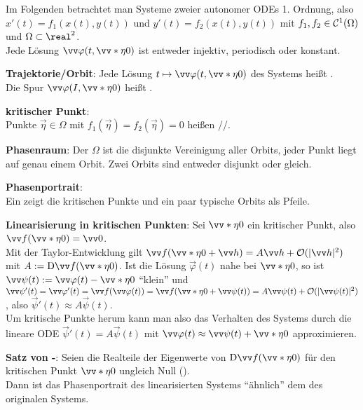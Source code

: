 Im Folgenden betrachtet man Systeme zweier autonomer ODEs 1. Ordnung, also\\
$x'(t) = f_1(x(t), y(t))$ und $y'(t) = f_2(x(t), y(t))$ mit
$f_1, f_2 \in \mathcal{C}^1(\Omega)$ und $\Omega \subset \real^2$.\\
Jede Lösung $\vec{\varphi}(t, \vecs{\eta}{0})$ ist entweder injektiv, periodisch oder konstant.

\textbf{Trajektorie/Orbit}:
Jede Lösung $t \mapsto \vec{\varphi}(t, \vecs{\eta}{0})$ des Systems heißt .\\
Die Spur $\vec{\varphi}(I, \vecs{\eta}{0})$ heißt .

\textbf{kritischer Punkt}:\\
Punkte $\vec{\eta} \in \Omega$ mit $f_1(\vec{\eta}) = f_2(\vec{\eta}) = 0$ heißen
//.

\textbf{Phasenraum}:
Der  $\Omega$ ist die disjunkte Vereinigung aller Orbits,
jeder Punkt liegt auf genau einem Orbit.
Zwei Orbits sind entweder disjunkt oder gleich.

\textbf{Phasenportrait}:\\
Ein  zeigt die kritischen Punkte und ein paar typische Orbits
als Pfeile.

\linie

\textbf{Linearisierung in kritischen Punkten}:
Sei $\vecs{\eta}{0}$ ein kritischer Punkt, also $\vec{f}(\vecs{\eta}{0}) = \vec{0}$.\\
Mit der Taylor-Entwicklung gilt $\vec{f}(\vecs{\eta}{0} + \vec{h}) = A\vec{h} + \O(|\vec{h}|^2)$
mit $A := \D\vec{f}(\vecs{\eta}{0})$.
Ist die Lösung $\vec{\varphi}(t)$ nahe bei $\vecs{\eta}{0}$, so ist
$\vec{\psi}(t) := \vec{\varphi}(t) - \vecs{\eta}{0}$ "`klein"' und\\
$\vec{\psi}'(t) = \vec{\varphi}'(t) = \vec{f}(\vec{\varphi}(t))
= \vec{f}(\vecs{\eta}{0} + \vec{\psi}(t)) = A\vec{\psi}(t) + \O(|\vec{\psi}(t)|^2)$,
also $\vec{\psi}'(t) \approx A\vec{\psi}(t)$.\\
Um kritische Punkte herum kann man also das Verhalten des Systems durch
die lineare ODE $\vec{\psi}'(t) = A\vec{\psi}(t)$ mit
$\vec{\varphi}(t) \approx \vec{\psi}(t) + \vecs{\eta}{0}$ approximieren.

\textbf{Satz von -}:
Seien die Realteile der Eigenwerte von $\D\vec{f}(\vecs{\eta}{0})$ für den kritischen Punkt
$\vecs{\eta}{0}$ ungleich Null ().\\
Dann ist das Phasenportrait des linearisierten Systems "`ähnlich"' dem des originalen Systems.

